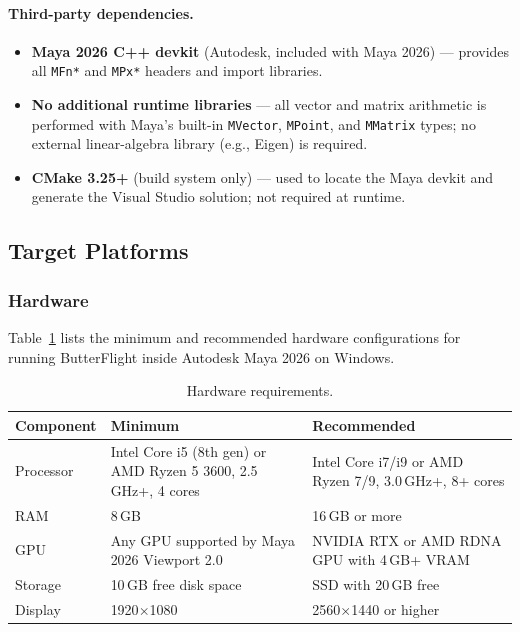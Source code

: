 \documentclass[12pt]{article}
\begin{document}
\paragraph{Third-party dependencies.}
\begin{itemize}
  \item \textbf{Maya 2026 C++ devkit} (Autodesk, included with Maya 2026) ---
    provides all \texttt{MFn*} and \texttt{MPx*} headers and import libraries.
  \item \textbf{No additional runtime libraries} --- all vector and matrix arithmetic
    is performed with Maya's built-in \texttt{MVector}, \texttt{MPoint}, and
    \texttt{MMatrix} types; no external linear-algebra library (e.g., Eigen) is
    required.
  \item \textbf{CMake 3.25+} (build system only) --- used to locate the Maya devkit
    and generate the Visual Studio solution; not required at runtime.
\end{itemize}

\subsection{Target Platforms}

\subsubsection{Hardware}

Table~\ref{tab:hw} lists the minimum and recommended hardware configurations
for running ButterFlight inside Autodesk Maya 2026 on Windows.

\begin{table}[H]
\centering
\caption{Hardware requirements.}
\label{tab:hw}
\begin{tabular}{|l|p{4.8cm}|p{4.8cm}|}
\hline
\textbf{Component} & \textbf{Minimum} & \textbf{Recommended} \\
\hline
Processor &
  Intel Core i5 (8th gen) or AMD Ryzen 5 3600, 2.5\,GHz+, 4 cores &
  Intel Core i7/i9 or AMD Ryzen 7/9, 3.0\,GHz+, 8+ cores \\
\hline
RAM & 8\,GB & 16\,GB or more \\
\hline
GPU &
  Any GPU supported by Maya 2026 Viewport 2.0 &
  NVIDIA RTX or AMD RDNA GPU with 4\,GB+ VRAM \\
\hline
Storage & 10\,GB free disk space & SSD with 20\,GB free \\
\hline
Display & 1920$\times$1080 & 2560$\times$1440 or higher \\
\hline
\end{tabular}
\end{table}
\end{document}
